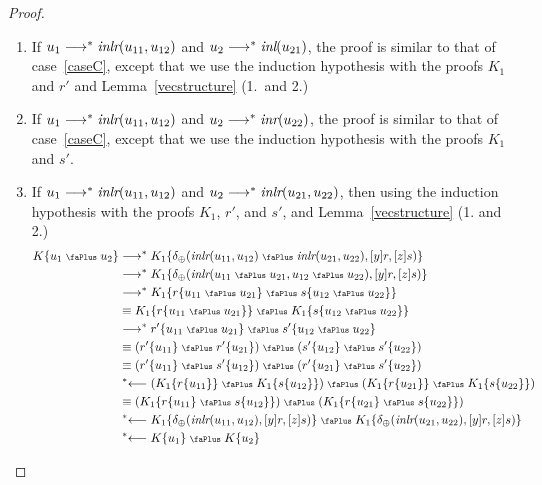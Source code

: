 \documentclass[screen, sigconf,authorversion,nonacm]{acmart}
\theoremstyle{acmdefinition}
\numberwithin{equation}{section}
\newcommand\abstr[1]{[#1]}
\newcommand\inl{\mbox{\it inl}}
\newcommand\inr{\mbox{\it inr}}
\newcommand\inlr{\mbox{\it inlr}}
\newcommand\plus{\mathrel{\text{\normalfont\scalebox{0.7}{\faPlus}}}}
\newcommand\lra{\longrightarrow}
\newcommand\lras{\lra^*}
\newcommand\llas{\mathrel{{}^*{\longleftarrow}}}
\newcommand\elimplus{\delta_{\oplus}}
\begin{document}
\begin{proof}
\begin{itemize}
\begin{itemize}
\begin{enumerate}
       \item If $u_1 \lras \inlr(u_{11},u_{12})$ and $u_2 \lras
         \inl(u_{21})$, the proof is similar to that of case~\eqref{caseC},
         except that we use the induction hypothesis with the proofs
         $K_1$ and $r'$ and Lemma~\ref{vecstructure} (1.~and 2.)

       \item If $u_1 \lras \inlr(u_{11},u_{12})$ and $u_2 \lras
         \inr(u_{22})$, the proof is similar to that of case~\eqref{caseC},
         except that we use the induction hypothesis with the proofs $K_1$ and
         $s'$.


       \item If $u_1 \lras \inlr(u_{11},u_{12})$ and $u_2 \lras
         \inlr(u_{21},u_{22})$, then using the induction hypothesis
         with the proofs $K_1$, $r'$, and $s'$, and
         Lemma~\ref{vecstructure} (1. and 2.)
\begin{align*}
     K\{u_1 \plus u_2\}
     &\lras K_1 \{\elimplus(\inlr(u_{11},u_{12}) \plus \inlr(u_{21},u_{22}),
        \abstr{y}r, \abstr{z}s)\}\\
     &\lras K_1 \{\elimplus(\inlr(u_{11} \plus u_{21},u_{12} \plus u_{22}),
        \abstr{y}r, \abstr{z}s)\}\\
     &\lras K_1 \{r\{u_{11} \plus u_{21}\} \plus s\{u_{12} \plus u_{22}\}\}\\
     &\equiv K_1 \{r\{u_{11} \plus u_{21}\}\} \plus K_1\{s\{u_{12} \plus u_{22}\}\}\\
     &\lras r'\{u_{11} \plus u_{21}\} \plus s'\{u_{12} \plus u_{22}\}\\
     &\equiv (r'\{u_{11}\} \plus r'\{u_{21}\}) \plus (s'\{u_{12}\} \plus s'\{u_{22}\})\\
     &\equiv (r'\{u_{11}\} \plus s'\{u_{12}\}) \plus (r'\{u_{21}\} \plus s'\{u_{22}\})\\
     &\llas (K_1\{r\{u_{11}\}\} \plus K_1\{s\{u_{12}\}\}) \plus
        (K_1 \{r\{u_{21}\}\} \plus K_1\{s\{u_{22}\}\})\\
     &\equiv (K_1\{r\{u_{11}\} \plus s\{u_{12}\}\}) \plus
        (K_1\{r\{u_{21}\} \plus s\{u_{22}\}\})\\
     &\llas K_1 \{\elimplus(\inlr(u_{11},u_{12}),\abstr{y}r,\abstr{z}s)\}
            \plus K_1 \{\elimplus(\inlr(u_{21},u_{22}),\abstr{y}r,\abstr{z}s)\}\\
     &\llas K\{u_1\} \plus K\{u_2\}
\end{align*}
\end{enumerate}


\end{itemize}
\end{itemize}
\end{proof}
\end{document}
